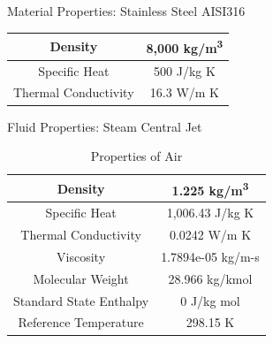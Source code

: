 \begin{frame}{Material Properties: Stainless Steel AISI316}
    \begin{table}[h]
        \centering
        \begin{tabular}{|c|c|}
        \hline
            Density & 8,000 kg/m\textsuperscript{3} \\
        \hline
            Specific Heat & 500 J/kg K \\
        \hline
            Thermal Conductivity & 16.3 W/m K \\
        \hline
        \end{tabular}
        \label{tab:steelaiai316}
    \end{table}
\end{frame}
\begin{frame}{Fluid Properties: Steam Central Jet}
    \begin{table}[h]
        \centering
        \caption{Properties of Air}
        \label{tab:airprop}
        \begin{tabular}{|c|c|}
        \hline
            Density & 1.225 kg/m\textsuperscript{3}\\
        \hline
            Specific Heat & 1,006.43 J/kg K \\
        \hline
            Thermal Conductivity & 0.0242 W/m K \\
        \hline
            Viscosity & 1.7894e-05 kg/m-s \\
        \hline
            Molecular Weight & 28.966 kg/kmol \\
        \hline
            Standard State Enthalpy & 0 J/kg mol \\
        \hline
            Reference Temperature & 298.15 K \\
        \hline
        \end{tabular}
    \end{table}
\end{frame}

